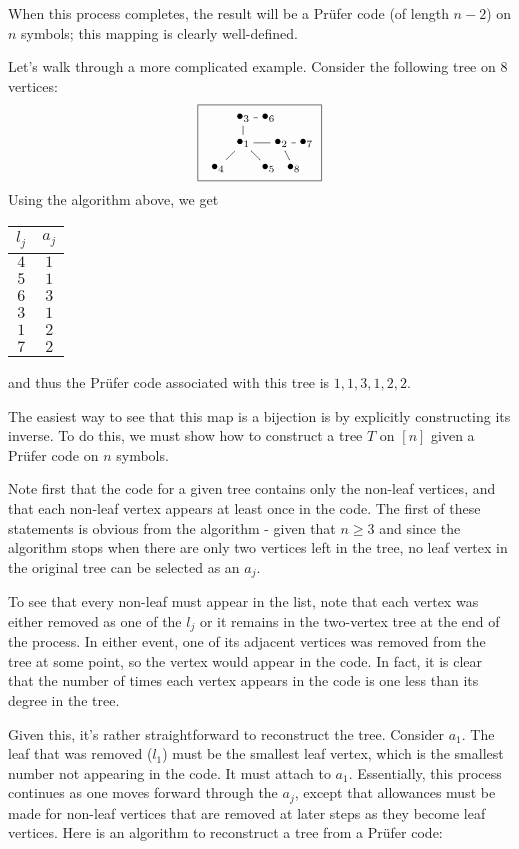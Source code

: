 \documentclass[12pt]{article}
\begin{document}
When this process completes, the result will be a Pr\"ufer code (of length $n-2$) on $n$ symbols; this mapping is clearly well-defined.

Let's walk through a more complicated example. Consider the following tree on $8$ vertices:
\[ \fbox{ \xygraph{
!{(0,0)   }*+{\bullet_{4}}="4"
!{(0.5,0.5) }*+{\bullet_{1}}="1"
!{(0.5,1) }*+{\bullet_{3}}="3"
!{(1,1)   }*+{\bullet_{6}}="6"
!{(1.25,.5)   }*+{\bullet_{2}}="2"
!{(1,0)   }*+{\bullet_{5}}="5"
!{(1.75,.5) }*+{\bullet_{7}}="7"
!{(1.5,0) }*+{\bullet_{8}}="8"
"1"-"2" "1"-"3" "1"-"4" "1"-"5"
"3"-"6"
"2"-"7" "2"-"8"
} } \]
Using the algorithm above, we get
\begin{center}
\begin{tabular}{c|c}
$l_j$ & $a_j$\\
\hline
$4$ & $1$\\
$5$ & $1$\\
$6$ & $3$\\
$3$ & $1$\\
$1$ & $2$\\
$7$ & $2$
\end{tabular}
\end{center}
and thus the Pr\"ufer code associated with this tree is $1,1,3,1,2,2$.

The easiest way to see that this map is a bijection is by explicitly constructing its inverse. To do this, we must show how to construct a tree $T$ on $[n]$ given a Pr\"ufer code on $n$ symbols.

Note first that the code for a given tree contains only the non-leaf vertices, and that each non-leaf vertex appears at least once in the code. The first of these statements is obvious from the algorithm - given that $n\geq 3$ and since the algorithm stops when there are only two vertices left in the tree, no leaf vertex in the original tree can be selected as an $a_j$.

To see that every non-leaf must appear in the list, note that each vertex was either removed as one of the $l_j$ or it remains in the two-vertex tree at the end of the process. In either event, one of its adjacent vertices was removed from the tree at some point, so the vertex would appear in the code. In fact, it is clear that the number of times each vertex appears in the code is one less than its degree in the tree.

Given this, it's rather straightforward to reconstruct the tree. Consider $a_1$. The leaf that was removed ($l_1$) must be the smallest leaf vertex, which is the smallest number not appearing in the code. It must attach to $a_1$. Essentially, this process continues as one moves forward through the $a_j$, except that allowances must be made for non-leaf vertices that are removed at later steps as they become leaf vertices. Here is an algorithm to reconstruct a tree from a Pr\"ufer code:
\end{document}
